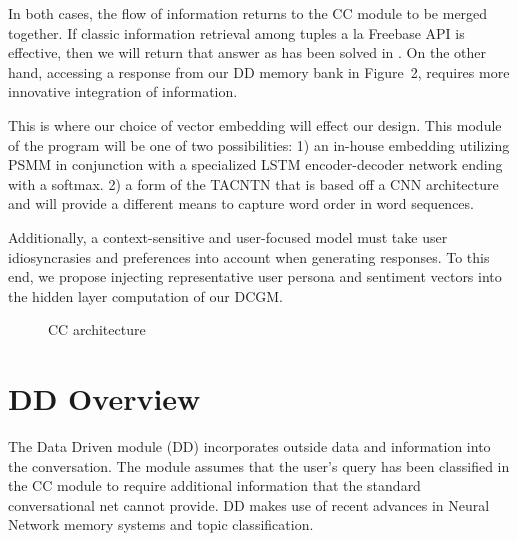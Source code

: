 \documentclass[10pt,twoside,twocolumn]{article}
\begin{document}
\noindent
In both cases, the flow of information returns to the CC module to be merged together. If classic information retrieval among tuples a la Freebase API is effective, then we will return that answer as has been solved in \cite{Iyyer2014, Yao2014a, Yao2014b}. On the other hand, accessing a response from our DD memory bank in Figure~2, requires more innovative integration of information.

\noindent
This is where our choice of vector embedding will effect our design. This module of the program will be one of two possibilities: 1) an in-house embedding utilizing PSMM \cite{Merity2016} in conjunction with a specialized LSTM encoder-decoder network ending with a softmax. 2) a form of the TACNTN \cite{Wu} that is based off a CNN architecture and will provide a different means to capture word order in word sequences.

\noindent
Additionally, a context-sensitive and user-focused model must take user idiosyncrasies and preferences into account when generating responses. To this end, we propose injecting representative user persona and sentiment vectors into the hidden layer computation of our DCGM. 

\begin{figure}[H]
    \centering
    
    \label{CCdesign}
    \caption{CC architecture}
\end{figure}

\section{DD Overview}
The Data Driven module (DD) incorporates outside data and information into the conversation. The module assumes that the user's query has been classified in the CC module to require additional information that the standard conversational net cannot provide. DD makes use of recent advances in Neural Network memory systems and topic classification.
\end{document}
